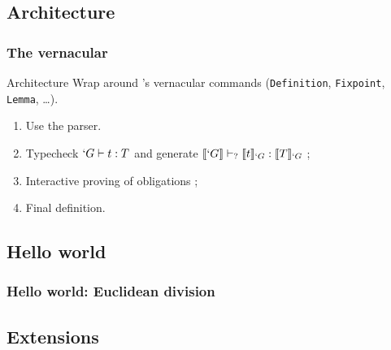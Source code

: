 \subsection{Architecture}
\begin{frame}[t]
  \frametitle{The \Program vernacular}
  
  \begin{block}{Architecture}
    Wrap around \Coq{}'s vernacular commands (\texttt{Definition},
    \texttt{Fixpoint}, \texttt{Lemma}, \ldots).
    
    \begin{enumerate}
    \item<2-> Use the \Coq{} parser.
    \item<3-> Typecheck $`G \vdash t : T$ and generate
      $\llbracket `G \rrbracket \vdash_{?} \llbracket t \rrbracket_{`G} : \llbracket T \rrbracket_{`G}$ ;
    \item<4-> Interactive proving of obligations ;
    \item<5-> Final definition.
    \end{enumerate}
  \end{block}
  
  
\end{frame}

\subsection{Hello world}
\begin{frame}
  \frametitle{Hello world: Euclidean division}

  \begin{center}
  \end{center}
\end{frame}

\subsection{Extensions}

